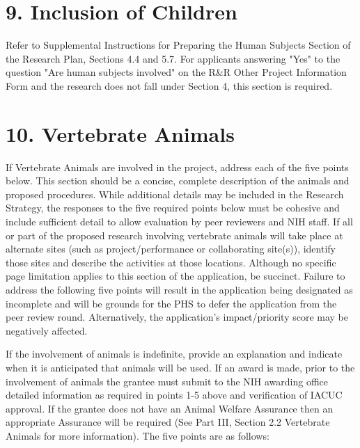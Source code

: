 \documentclass[11pt, notitlepage]{article} %
\begin{document}
\newpage

\section*{9. Inclusion of Children}

Refer to Supplemental Instructions for Preparing the Human Subjects Section of the Research Plan, Sections 4.4 and 5.7. For applicants answering "Yes" to the question "Are human subjects involved" on the R\&R Other Project Information Form and the research does not fall under Section 4, this section is required.


\newpage

\section*{10. Vertebrate Animals}

If Vertebrate Animals are involved in the project, address each of the five points below. This section should be a concise, complete description of the animals and proposed procedures. While additional details may be included in the Research Strategy, the responses to the five required points below must be cohesive and include sufficient detail to allow evaluation by peer reviewers and NIH staff. If all or part of the proposed research involving vertebrate animals will take place at alternate sites (such as project/performance or collaborating site(s)), identify those sites and describe the activities at those locations. Although no specific page limitation applies to this section of the application, be succinct. Failure to address the following five points will result in the application being designated as incomplete and will be grounds for the PHS to defer the application from the peer review round. Alternatively, the application’s impact/priority score may be negatively affected.

If the involvement of animals is indefinite, provide an explanation and indicate when it is anticipated that animals will be used. If an award is made, prior to the involvement of animals the grantee must submit to the NIH awarding office detailed information as required in points 1-5 above and verification of IACUC approval. If the grantee does not have an Animal Welfare Assurance then an appropriate Assurance will be required (See Part III, Section 2.2 Vertebrate Animals for more information).
The five points are as follows:
\end{document}
